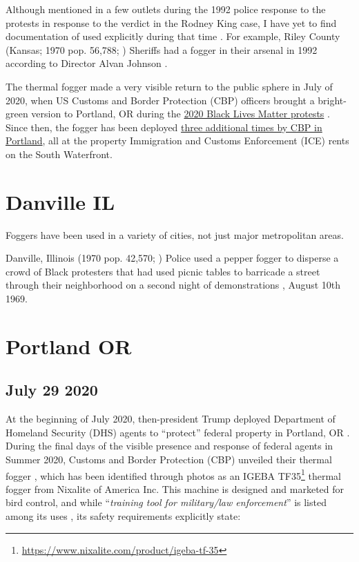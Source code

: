 \documentclass[
  12pt,
]{krantz}
\renewcommand{\href}[2]{#2\footnote{\url{#1}}}
\begin{document}
Although mentioned in a few outlets during the 1992 police response to the protests in response to the verdict in the Rodney King case, I have yet to find documentation of used explicitly during that time \citep{Askren1992}.
For example, Riley County (Kansas; 1970 pop. 56,788; \citet{USCB1970}) Sheriffs had a fogger in their arsenal in 1992 according to Director Alvan Johnson \citep{Askren1992}.

The thermal fogger made a very visible return to the public sphere in July of 2020, when US Customs and Border Protection (CBP) officers brought a bright-green version to Portland, OR during the \protect\hyperlink{PortlandOR2020_07_29}{2020 Black Lives Matter protests} \citep{pb20202021}.
Since then, the fogger has been deployed \protect\hyperlink{PortlandORICE2020_2021}{three additional times by CBP in Portland}, all at the property Immigration and Customs Enforcement (ICE) rents on the South Waterfront.

\hypertarget{danville-il}{%
\section*{Danville IL}\label{danville-il}}


Foggers have been used in a variety of cities, not just major metropolitan areas.

Danville, Illinois (1970 pop. 42,570; \citep{USCB1970}) Police used a pepper fogger to disperse a crowd of Black protesters that had used picnic tables to barricade a street through their neighborhood on a second night of demonstrations \citep{Palladium-Item1969}, August 10th 1969.

\hypertarget{PortlandOR2020_2021}{%
\section*{Portland OR}\label{PortlandOR2020_2021}}


\hypertarget{PortlandOR2020_07_29}{%
\subsection*{July 29 2020}\label{PortlandOR2020_07_29}}


At the beginning of July 2020, then-president Trump deployed Department of Homeland Security (DHS) agents to ``protect'' federal property in Portland, OR \citep{DHS2020, Flanigan2020, Trump2020}.
During the final days of the visible presence and response of federal agents in Summer 2020, Customs and Border Protection (CBP) unveiled their thermal fogger \citep{Recompiler2020_07_29}, which has been identified through photos as an \href{https://www.nixalite.com/product/igeba-tf-35}{IGEBA TF35} thermal fogger from Nixalite of America Inc.
This machine is designed and marketed for bird control, and while ``\emph{training tool for military/law enforcement}'' is listed among its uses \citep{Nixalite2009a}, its safety requirements explicitly state:
\end{document}
